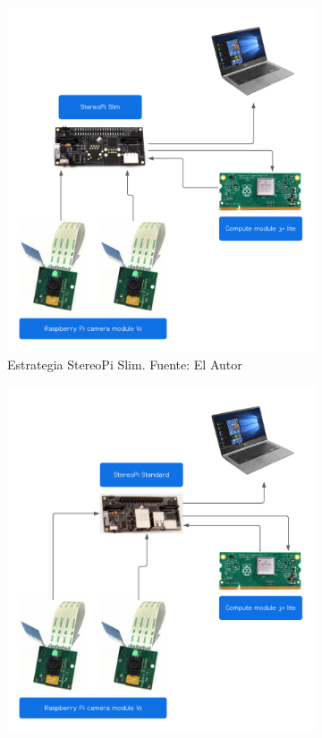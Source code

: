 \begin{figure}[H]
     \centering
     \begin{subfigure}[b]{0.4\textwidth}
        \centering
        \includegraphics[scale=0.4]{Recursos/estrategia_stereopi_slim.png}
        \caption[Estrategia StereoPi Slim.]{Estrategia StereoPi Slim. {\footnotesize Fuente: El Autor}}
        \label{estrategia_slim}
     \end{subfigure}
     \hfill
     \begin{subfigure}[b]{0.4\textwidth}
         \centering
        \includegraphics[scale=0.4]{Recursos/estrategia_stereo_pi_standard.png}

\end{subfigure}
\end{figure}
